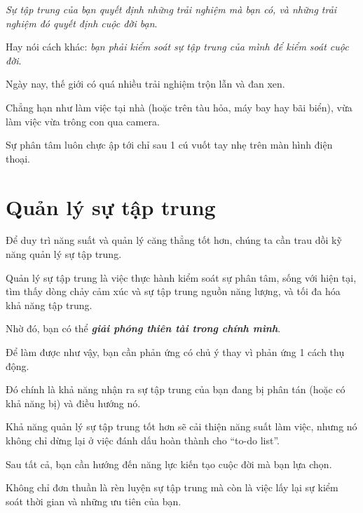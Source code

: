 \documentclass{book}
\numberwithin{equation}{section}
\begin{document}
%
\textit{Sự tập trung của bạn quyết định những trải nghiệm mà bạn có, và những trải nghiệm đó quyết định cuộc đời bạn}.

Hay nói cách khác: \textit{bạn phải kiểm soát sự tập trung của mình để kiểm soát cuộc đời}.

Ngày nay, thế giới có quá nhiều trải nghiệm trộn lẫn và đan xen.

Chẳng hạn như làm việc tại nhà (hoặc trên tàu hỏa, máy bay hay bãi biển), vừa làm việc vừa trông con qua camera.

Sự phân tâm luôn chực ập tới chỉ sau 1 cú vuốt tay nhẹ trên màn hình điện thoại.

\section{Quản lý sự tập trung}
Để duy trì năng suất và quản lý căng thẳng tốt hơn, chúng ta cần trau dồi kỹ năng quản lý sự tập trung.

%
Quản lý sự tập trung là việc thực hành kiểm soát sự phân tâm, sống với hiện tại, tìm thấy dòng chảy cảm xúc và sự tập trung nguồn năng lượng, và tối đa hóa khả năng tập trung.

Nhờ đó, bạn có thể \textbf{\textit{giải phóng thiên tài trong chính mình}}.

Để làm được như vậy, bạn cần phản ứng có chủ ý thay vì phản ứng 1 cách thụ động.

Đó chính là khả năng nhận ra sự tập trung của bạn đang bị phân tán (hoặc có khả năng bị) và điều hướng nó.

%
Khả năng quản lý sự tập trung tốt hơn sẽ cải thiện năng suất làm việc, nhưng nó không chỉ dừng lại ở việc đánh dấu hoàn thành cho ``to-do list''.

Sau tất cả, bạn cần hướng đến năng lực kiến tạo cuộc đời mà bạn lựa chọn.

Không chỉ đơn thuần là rèn luyện sự tập trung mà còn là việc lấy lại sự kiểm soát thời gian và những ưu tiên của bạn.
\end{document}
